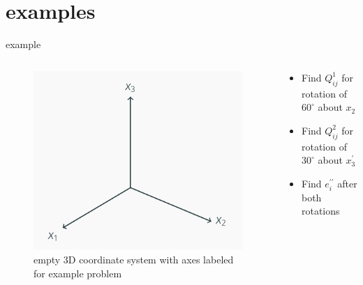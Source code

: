 \documentclass[
  letterpaper,
  ignorenonframetext,
  aspectratio=43,
  handout,
  12pt]{beamer}
\providecommand{\tightlist}{%
  \setlength{\itemsep}{0pt}\setlength{\parskip}{0pt}}
\providecommand{\tightlist}{%
\setlength{\itemsep}{0pt}\setlength{\parskip}{0pt}}
\let\Oldincludegraphics\includegraphics
\renewcommand{\includegraphics}[2][]{\Oldincludegraphics[width=\textwidth,height=0.7\textheight,keepaspectratio]{#2}}
\begin{document}
\hypertarget{examples}{%
\section{examples}\label{examples}}

\begin{frame}{example}
\protect\hypertarget{example-5}{}
\begin{columns}[T]
\begin{column}{0.5\textwidth}
\begin{figure}
\centering
\includegraphics{../images/example-a.png}
\caption{empty 3D coordinate system with axes labeled for example
problem}
\end{figure}
\end{column}

\begin{column}{0.5\textwidth}
\begin{itemize}
\tightlist
\item
  Find \(Q_{ij}^1\) for rotation of \(60^\circ\) about \(x_2\)
\item
  Find \(Q_{ij}^2\) for rotation of \(30^\circ\) about \(x_3^\prime\)
\item
  Find \(e_i^{\prime \prime}\) after both rotations
\end{itemize}
\end{column}
\end{columns}
\end{frame}
\end{document}
